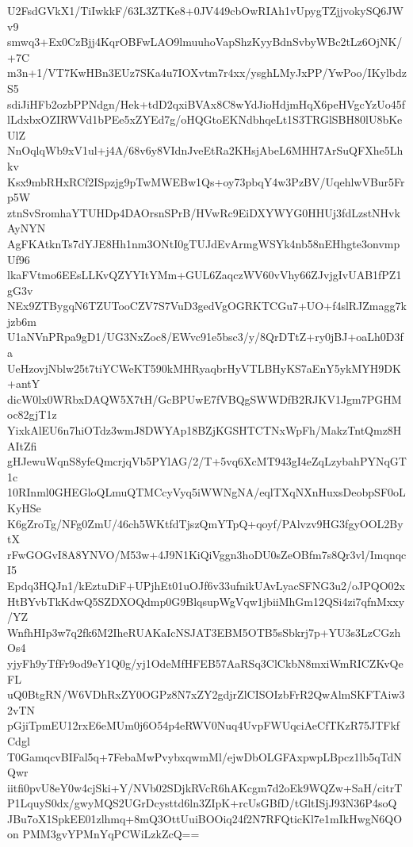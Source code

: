 U2FsdGVkX1/TiIwkkF/63L3ZTKe8+0JV449cbOwRIAh1vUpygTZjjvokySQ6JWv9
smwq3+Ex0CzBjj4KqrOBFwLAO9lmuuhoVapShzKyyBdnSvbyWBc2tLz6OjNK/+7C
m3n+1/VT7KwHBn3EUz7SKa4u7IOXvtm7r4xx/ysghLMyJxPP/YwPoo/IKylbdzS5
sdiJiHFb2ozbPPNdgn/Hek+tdD2qxiBVAx8C8wYdJioHdjmHqX6peHVgcYzUo45f
lLdxbxOZIRWVd1bPEe5xZYEd7g/oHQGtoEKNdbhqeLt1S3TRGlSBH80lU8bKeUlZ
NnOqlqWb9xV1ul+j4A/68v6y8VIdnJveEtRa2KHsjAbeL6MHH7ArSuQFXhe5Lhkv
Ksx9mbRHxRCf2ISpzjg9pTwMWEBw1Qs+oy73pbqY4w3PzBV/UqehlwVBur5Frp5W
ztnSvSromhaYTUHDp4DAOrsnSPrB/HVwRc9EiDXYWYG0HHUj3fdLzstNHvkAyNYN
AgFKAtknTs7dYJE8Hh1nm3ONtI0gTUJdEvArmgWSYk4nb58nEHhgte3onvmpUf96
lkaFVtmo6EEsLLKvQZYYItYMm+GUL6ZaqczWV60vVhy66ZJvjgIvUAB1fPZ1gG3v
NEx9ZTBygqN6TZUTooCZV7S7VuD3gedVgOGRKTCGu7+UO+f4slRJZmagg7kjzb6m
U1aNVnPRpa9gD1/UG3NxZoc8/EWvc91e5bsc3/y/8QrDTtZ+ry0jBJ+oaLh0D3fa
UeHzovjNblw25t7tiYCWeKT590kMHRyaqbrHyVTLBHyKS7aEnY5ykMYH9DK+antY
dicW0lx0WRbxDAQW5X7tH/GcBPUwE7fVBQgSWWDfB2RJKV1Jgm7PGHMoc82gjT1z
YixkAlEU6n7hiOTdz3wmJ8DWYAp18BZjKGSHTCTNxWpFh/MakzTntQmz8HAItZfi
gHJewuWqnS8yfeQmcrjqVb5PYlAG/2/T+5vq6XcMT943gI4eZqLzybahPYNqGT1c
10RInml0GHEGloQLmuQTMCcyVyq5iWWNgNA/eqlTXqNXnHuxsDeobpSF0oLKyHSe
K6gZroTg/NFg0ZmU/46ch5WKtfdTjszQmYTpQ+qoyf/PAlvzv9HG3fgyOOL2BytX
rFwGOGvI8A8YNVO/M53w+4J9N1KiQiVggn3hoDU0sZeOBfm7s8Qr3vl/ImqnqcI5
Epdq3HQJn1/kEztuDiF+UPjhEt01uOJf6v33ufnikUAvLyacSFNG3u2/oJPQO02x
HtBYvbTkKdwQ5SZDXOQdmp0G9BlqsupWgVqw1jbiiMhGm12QSi4zi7qfnMxxy/YZ
WnfhHIp3w7q2fk6M2IheRUAKaIcNSJAT3EBM5OTB5sSbkrj7p+YU3s3LzCGzhOs4
yjyFh9yTfFr9od9eY1Q0g/yj1OdeMfHFEB57AaRSq3ClCkbN8mxiWmRICZKvQeFL
uQ0BtgRN/W6VDhRxZY0OGPz8N7xZY2gdjrZlCISOIzbFrR2QwAlmSKFTAiw32vTN
pGjiTpmEU12rxE6eMUm0j6O54p4eRWV0Nuq4UvpFWUqciAeCfTKzR75JTFkfCdgl
T0GamqcvBIFal5q+7FebaMwPvybxqwmMl/ejwDbOLGFAxpwpLBpcz1lb5qTdNQwr
iitfi0pvU8eY0w4cjSki+Y/NVb02SDjkRVcR6hAKcgm7d2oEk9WQZw+SaH/citrT
P1LquyS0dx/gwyMQS2UGrDcysttd6ln3ZIpK+rcUsGBfD/tGltISjJ93N36P4soQ
JBu7oX1SpkEE01zlhmq+8mQ3OttUuiBOOiq24f2N7RFQticKl7e1mIkHwgN6QOon
PMM3gvYPMnYqPCWiLzkZcQ==
